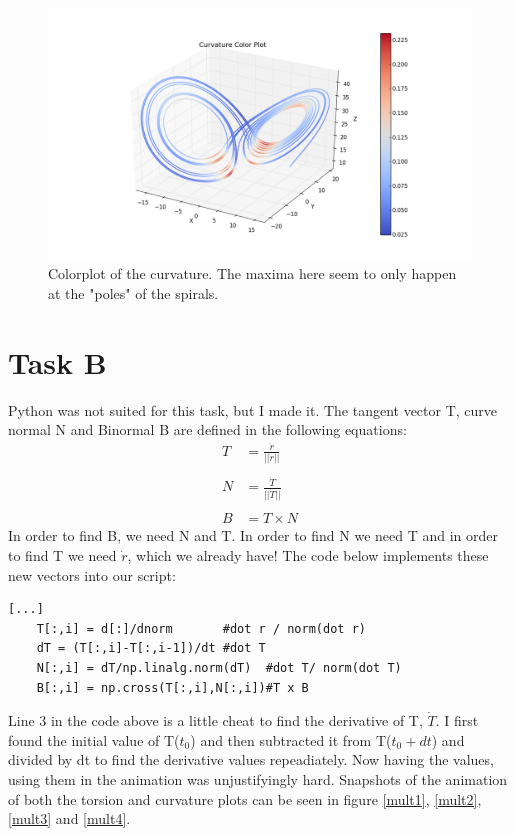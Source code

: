 \documentclass[a4paper,10pt]{article}
\begin{document}
\begin{figure}
 \centering
 \includegraphics[width=\linewidth]{curv}
 \caption{Colorplot of the curvature. The maxima here seem to only happen at the "poles" of the spirals.}
  \label{curv}
  
\end{figure}
\clearpage
\section*{Task B}
Python was not suited for this task, but I made it. The tangent vector T, curve normal N and Binormal B are defined in the following equations:
\begin{align}
 T & = \frac{\dot r}{||\dot r ||} \\
 & \nonumber \\
 N & = \frac{\dot T}{||\dot T ||} \\
 & \nonumber \\
 B & = T \times N 
\end{align}
In order to find B, we need N and T. In order to find N we need T and in order to find T we need $\dot r$, which we already have! The code below implements these new vectors into our script:
\begin{lstlisting}
[...]
    T[:,i] = d[:]/dnorm       #dot r / norm(dot r)
    dT = (T[:,i]-T[:,i-1])/dt #dot T
    N[:,i] = dT/np.linalg.norm(dT)  #dot T/ norm(dot T)
    B[:,i] = np.cross(T[:,i],N[:,i])#T x B
\end{lstlisting}
Line 3 in the code above is a little cheat to find the derivative of T, $\dot T$. I first found the initial value of T($t_0$) and then subtracted it from T($t_0 + dt$) and divided by dt to find the derivative values repeadiately.
Now having the values, using them in the animation was unjustifyingly hard. Snapshots of the animation of both the torsion and curvature plots can be seen in figure \ref{mult1}, \ref{mult2}, \ref{mult3} and \ref{mult4}.
\end{document}
